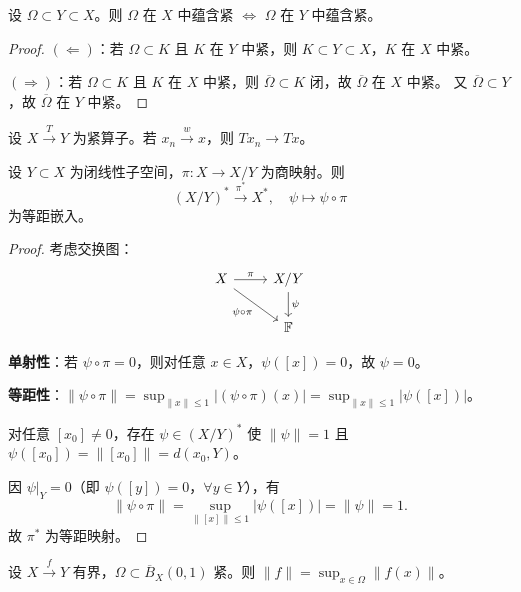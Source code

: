 \documentclass[lang=cn,a4paper,newtx,section]{elegantbook}
\begin{document}
\begin{proposition}
  设 $\Omega\subset Y\subset X$。则 $\Omega$ 在 $X$ 中蕴含紧 $\Longleftrightarrow$ $\Omega$ 在 $Y$ 中蕴含紧。
\end{proposition}

\begin{proof}
  $(\Leftarrow)$：若 $\Omega\subset K$ 且 $K$ 在 $Y$ 中紧，则 $K\subset Y\subset X$，$K$ 在 $X$ 中紧。

  $(\Rightarrow)$：若 $\Omega\subset K$ 且 $K$ 在 $X$ 中紧，则 $\overline{\Omega}\subset K$ 闭，故 $\overline{\Omega}$ 在 $X$ 中紧。
  又 $\overline{\Omega}\subset Y$，故 $\overline{\Omega}$ 在 $Y$ 中紧。
\end{proof}

\begin{proposition}
  设 $X\xrightarrow{T}Y$ 为紧算子。若 $x_n\xrightarrow{w}x$，则 $Tx_n\to Tx$。
\end{proposition}

\begin{proposition}
  设 $Y\subset X$ 为闭线性子空间，$\pi:X\to X/Y$ 为商映射。则
  \[
    (X/Y)^*\xrightarrow{\pi^*}X^*,\quad\psi\mapsto\psi\circ\pi
  \]
  为等距嵌入。
\end{proposition}

\begin{proof}
  考虑交换图：
  \[
    \begin{tikzcd}
      X \arrow[r,"\pi"] \arrow[dr,"\psi\circ\pi"'] & X/Y \arrow[d,"\psi"] \\
      & \mathbb{F}
    \end{tikzcd}
  \]
  
  \textbf{单射性}：若 $\psi\circ\pi=0$，则对任意 $x\in X$，$\psi([x])=0$，故 $\psi=0$。

  \textbf{等距性}：$\|\psi\circ\pi\|=\sup_{\|x\|\le 1}|(\psi\circ\pi)(x)|=\sup_{\|x\|\le 1}|\psi([x])|$。
  
  对任意 $[x_0]\ne 0$，存在 $\psi\in(X/Y)^*$ 使 $\|\psi\|=1$ 且 $\psi([x_0])=\|[x_0]\|=d(x_0,Y)$。
  
  因 $\psi|_Y=0$（即 $\psi([y])=0$，$\forall y\in Y$），有
  \[
    \|\psi\circ\pi\|=\sup_{\|[x]\|\le 1}|\psi([x])|=\|\psi\|=1.
  \]
  故 $\pi^*$ 为等距映射。
\end{proof}

\begin{proposition}
  设 $X\xrightarrow{f}Y$ 有界，$\Omega\subset\overline{B}_X(0,1)$ 紧。则 $\|f\|=\sup_{x\in\Omega}\|f(x)\|$。
\end{proposition}
\end{document}

